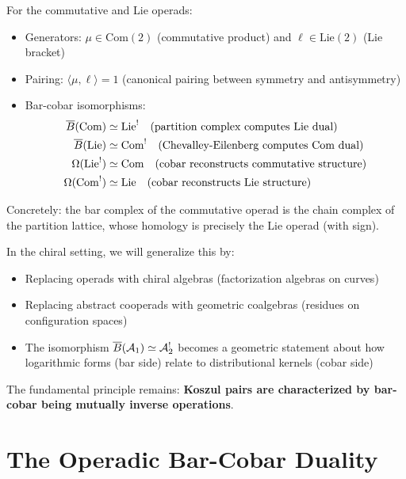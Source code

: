\begin{example}
For the commutative and Lie operads:
\begin{itemize}
\item Generators: $\mu \in \text{Com}(2)$ (commutative product) and $\ell \in \text{Lie}(2)$ (Lie bracket)
\item Pairing: $\langle \mu, \ell \rangle = 1$ (canonical pairing between symmetry and antisymmetry)
\item Bar-cobar isomorphisms:
\begin{align*}
\overline{B}(\text{Com}) &\simeq \text{Lie}^! \quad \text{(partition complex computes Lie dual)} \\
\overline{B}(\text{Lie}) &\simeq \text{Com}^! \quad \text{(Chevalley-Eilenberg computes Com dual)} \\
\Omega(\text{Lie}^!) &\simeq \text{Com} \quad \text{(cobar reconstructs commutative structure)} \\
\Omega(\text{Com}^!) &\simeq \text{Lie} \quad \text{(cobar reconstructs Lie structure)}
\end{align*}
\end{itemize}

Concretely: the bar complex of the commutative operad is the chain complex of the partition lattice, whose homology is precisely the Lie operad (with sign).
\end{example}

\begin{remark}
In the chiral setting, we will generalize this by:
\begin{itemize}
\item Replacing operads with chiral algebras (factorization algebras on curves)
\item Replacing abstract cooperads with geometric coalgebras (residues on configuration spaces)
\item The isomorphism $\overline{B}(\mathcal{A}_1) \simeq \mathcal{A}_2^!$ becomes a geometric statement about how logarithmic forms (bar side) relate to distributional kernels (cobar side)
\end{itemize}
The fundamental principle remains: \textbf{Koszul pairs are characterized by bar-cobar being mutually inverse operations}.
\end{remark}

\section{The Operadic Bar-Cobar Duality}
 
